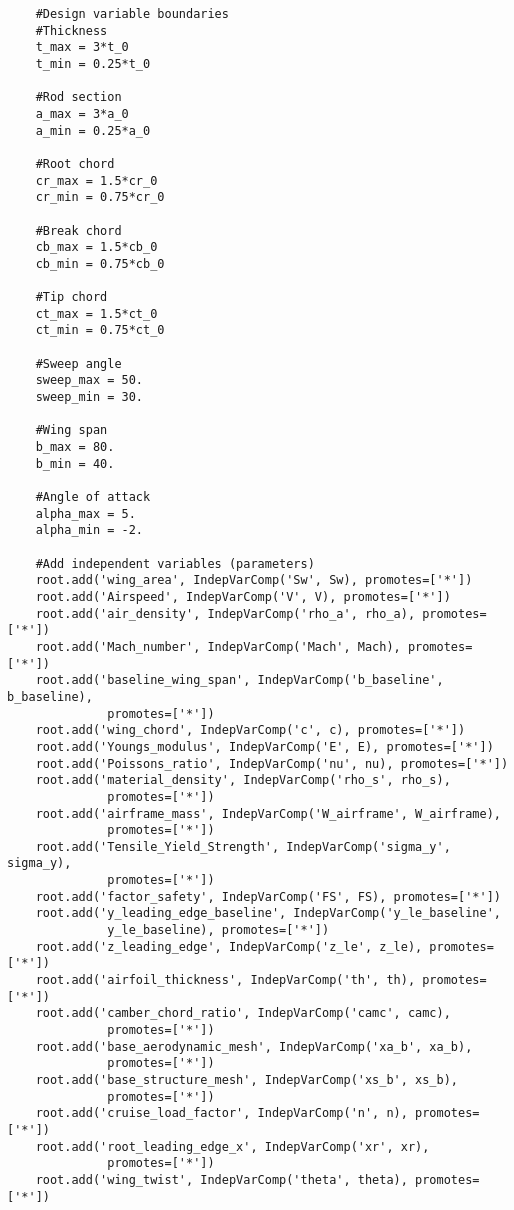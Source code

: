 \begin{lstlisting}
    #Design variable boundaries
    #Thickness
    t_max = 3*t_0
    t_min = 0.25*t_0
    
    #Rod section
    a_max = 3*a_0
    a_min = 0.25*a_0
    
    #Root chord 
    cr_max = 1.5*cr_0
    cr_min = 0.75*cr_0
    
    #Break chord
    cb_max = 1.5*cb_0
    cb_min = 0.75*cb_0
    
    #Tip chord
    ct_max = 1.5*ct_0
    ct_min = 0.75*ct_0
    
    #Sweep angle
    sweep_max = 50.
    sweep_min = 30.
    
    #Wing span 
    b_max = 80.
    b_min = 40.
    
    #Angle of attack
    alpha_max = 5.
    alpha_min = -2.

    #Add independent variables (parameters)
    root.add('wing_area', IndepVarComp('Sw', Sw), promotes=['*'])
    root.add('Airspeed', IndepVarComp('V', V), promotes=['*'])
    root.add('air_density', IndepVarComp('rho_a', rho_a), promotes=['*'])
    root.add('Mach_number', IndepVarComp('Mach', Mach), promotes=['*'])
    root.add('baseline_wing_span', IndepVarComp('b_baseline', b_baseline), 
              promotes=['*'])
    root.add('wing_chord', IndepVarComp('c', c), promotes=['*'])
    root.add('Youngs_modulus', IndepVarComp('E', E), promotes=['*'])
    root.add('Poissons_ratio', IndepVarComp('nu', nu), promotes=['*'])
    root.add('material_density', IndepVarComp('rho_s', rho_s), 
              promotes=['*'])
    root.add('airframe_mass', IndepVarComp('W_airframe', W_airframe), 
              promotes=['*'])
    root.add('Tensile_Yield_Strength', IndepVarComp('sigma_y', sigma_y), 
              promotes=['*'])
    root.add('factor_safety', IndepVarComp('FS', FS), promotes=['*'])
    root.add('y_leading_edge_baseline', IndepVarComp('y_le_baseline', 
              y_le_baseline), promotes=['*'])
    root.add('z_leading_edge', IndepVarComp('z_le', z_le), promotes=['*'])
    root.add('airfoil_thickness', IndepVarComp('th', th), promotes=['*'])
    root.add('camber_chord_ratio', IndepVarComp('camc', camc), 
              promotes=['*'])
    root.add('base_aerodynamic_mesh', IndepVarComp('xa_b', xa_b), 
              promotes=['*'])
    root.add('base_structure_mesh', IndepVarComp('xs_b', xs_b), 
              promotes=['*'])
    root.add('cruise_load_factor', IndepVarComp('n', n), promotes=['*'])
    root.add('root_leading_edge_x', IndepVarComp('xr', xr), 
              promotes=['*'])
    root.add('wing_twist', IndepVarComp('theta', theta), promotes=['*'])


\end{lstlisting}
